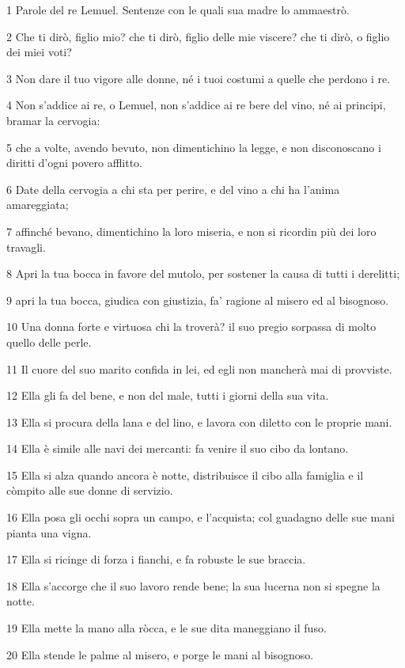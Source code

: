 \par 1 Parole del re Lemuel. Sentenze con le quali sua madre lo ammaestrò.
\par 2 Che ti dirò, figlio mio? che ti dirò, figlio delle mie viscere? che ti dirò, o figlio dei miei voti?
\par 3 Non dare il tuo vigore alle donne, né i tuoi costumi a quelle che perdono i re.
\par 4 Non s'addice ai re, o Lemuel, non s'addice ai re bere del vino, né ai principi, bramar la cervogia:
\par 5 che a volte, avendo bevuto, non dimentichino la legge, e non disconoscano i diritti d'ogni povero afflitto.
\par 6 Date della cervogia a chi sta per perire, e del vino a chi ha l'anima amareggiata;
\par 7 affinché bevano, dimentichino la loro miseria, e non si ricordin più dei loro travagli.
\par 8 Apri la tua bocca in favore del mutolo, per sostener la causa di tutti i derelitti;
\par 9 apri la tua bocca, giudica con giustizia, fa' ragione al misero ed al bisognoso.
\par 10 Una donna forte e virtuosa chi la troverà? il suo pregio sorpassa di molto quello delle perle.
\par 11 Il cuore del suo marito confida in lei, ed egli non mancherà mai di provviste.
\par 12 Ella gli fa del bene, e non del male, tutti i giorni della sua vita.
\par 13 Ella si procura della lana e del lino, e lavora con diletto con le proprie mani.
\par 14 Ella è simile alle navi dei mercanti: fa venire il suo cibo da lontano.
\par 15 Ella si alza quando ancora è notte, distribuisce il cibo alla famiglia e il còmpito alle sue donne di servizio.
\par 16 Ella posa gli occhi sopra un campo, e l'acquista; col guadagno delle sue mani pianta una vigna.
\par 17 Ella si ricinge di forza i fianchi, e fa robuste le sue braccia.
\par 18 Ella s'accorge che il suo lavoro rende bene; la sua lucerna non si spegne la notte.
\par 19 Ella mette la mano alla ròcca, e le sue dita maneggiano il fuso.
\par 20 Ella stende le palme al misero, e porge le mani al bisognoso.
